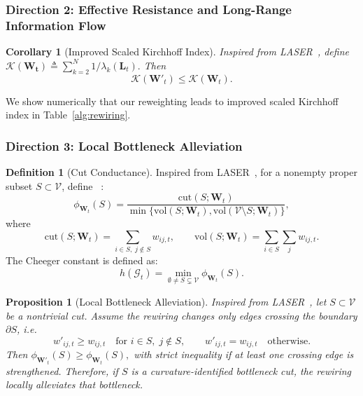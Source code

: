 \documentclass{article}
\theoremstyle{plain}
\newtheorem{proposition}[theorem]{Proposition}
\newtheorem{corollary}[theorem]{Corollary}
\theoremstyle{definition}
\newtheorem{definition}[theorem]{Definition}
\theoremstyle{remark}
\begin{document}
\subsubsection{Direction 2: Effective Resistance and Long-Range Information Flow}
\label{sssec:eff-res}

\begin{corollary}[Improved Scaled Kirchhoff Index]
\label{cor:total-eff-res}
Inspired from LASER~\cite{barbero2024laser}, define $
\mathcal{K}(\mathbf{W_t})
\triangleq
\sum_{k=2}^N {1/\lambda_k(\mathbf{L}_t)}.
$
Then
\[
\mathcal{K}(\mathbf{W}'_t) \le \mathcal{K}(\mathbf{W}_t).
\]
\end{corollary}

We show numerically that our reweighting leads to improved scaled Kirchhoff index in Table~\ref{alg:rewiring}.


\subsubsection{Direction 3: Local Bottleneck Alleviation}
\label{sssec:oversquashing}

\begin{definition}[Cut Conductance]
\label{def:cheeger}
Inspired from LASER~\cite{barbero2024laser}, for a nonempty proper subset $S\subset \mathcal{V}$, define ~\cite{barbero2024laser}:
\[
\phi_{\mathbf W_t}(S)
=
\frac{\mathrm{cut}(S;\mathbf W_t)}
     {\min\{\mathrm{vol}(S;\mathbf W_t),\mathrm{vol}(\mathcal V\setminus S;\mathbf W_t)\}},
\]
where
\[
\mathrm{cut}(S;\mathbf W_t)
=
\sum_{i\in S,\; j\notin S} w_{ij,t},
\qquad
\mathrm{vol}(S;\mathbf W_t)
=
\sum_{i\in S}\sum_j w_{ij,t}.
\]
The Cheeger constant is defined as:
\[
h(\mathcal G_t)=\min_{\emptyset\neq S\subsetneq\mathcal V}\phi_{\mathbf W_t}(S).
\]
\end{definition}

\begin{proposition}[Local Bottleneck Alleviation]
\label{prop:oversquashing}
Inspired from LASER~\cite{barbero2024laser}, let $S\subset \mathcal V$ be a nontrivial cut. Assume the rewiring changes only
edges crossing the boundary $\partial S$, i.e.
\[
w'_{ij,t}\ge w_{ij,t}
\quad \text{for } i\in S,\; j\notin S,
\qquad
w'_{ij,t}=w_{ij,t}
\quad \text{otherwise.}
\]
Then
$
\phi_{\mathbf W'_t}(S)\ge \phi_{\mathbf W_t}(S),
$
with strict inequality if at least one crossing edge is strengthened.
Therefore, if $S$ is a curvature-identified bottleneck cut, the rewiring
locally alleviates that bottleneck.
\end{proposition}
\end{document}
